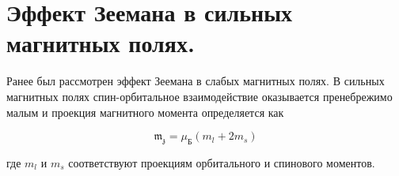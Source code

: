\section{Эффект Зеемана в сильных магнитных полях.}

Ранее был рассмотрен эффект Зеемана в слабых магнитных полях. В сильных магнитных полях спин-орбитальное взаимодействие оказывается пренебрежимо малым и проекция магнитного момента определяется как

\begin{equation}
    \mathfrak{m_z} = \mu_\text{Б} \left( m_l + 2 m_s \right)
\end{equation}

\noindent
где $m_l$ и $m_s$ соответствуют проекциям орбитального и спинового моментов.